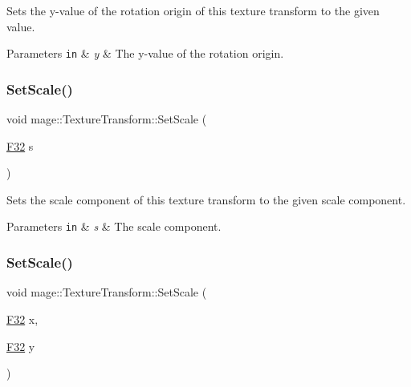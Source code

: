 Sets the y-\/value of the rotation origin of this texture transform to the given value.


\begin{DoxyParams}[1]{Parameters}
\mbox{\tt in}  & {\em y} & The y-\/value of the rotation origin. \\
\hline
\end{DoxyParams}
\hypertarget{classmage_1_1_texture_transform_aee6f84fbb4b7d57931aab72b6cec5b6c}{}\label{classmage_1_1_texture_transform_aee6f84fbb4b7d57931aab72b6cec5b6c} 
\subsubsection{\texorpdfstring{Set\+Scale()}{SetScale()}\hspace{0.1cm}{\footnotesize\ttfamily [1/4]}}
{\footnotesize\ttfamily void mage\+::\+Texture\+Transform\+::\+Set\+Scale (\begin{DoxyParamCaption}\item[{\hyperlink{namespacemage_aa97e833b45f06d60a0a9c4fc22ae02c0}{F32}}]{s }\end{DoxyParamCaption})\hspace{0.3cm}{\ttfamily [noexcept]}}

Sets the scale component of this texture transform to the given scale component.


\begin{DoxyParams}[1]{Parameters}
\mbox{\tt in}  & {\em s} & The scale component. \\
\hline
\end{DoxyParams}
\hypertarget{classmage_1_1_texture_transform_ac3af8885cf4b4c6ad97138bbaf12cda1}{}\label{classmage_1_1_texture_transform_ac3af8885cf4b4c6ad97138bbaf12cda1} 
\subsubsection{\texorpdfstring{Set\+Scale()}{SetScale()}\hspace{0.1cm}{\footnotesize\ttfamily [2/4]}}
{\footnotesize\ttfamily void mage\+::\+Texture\+Transform\+::\+Set\+Scale (\begin{DoxyParamCaption}\item[{\hyperlink{namespacemage_aa97e833b45f06d60a0a9c4fc22ae02c0}{F32}}]{x,  }\item[{\hyperlink{namespacemage_aa97e833b45f06d60a0a9c4fc22ae02c0}{F32}}]{y }\end{DoxyParamCaption})\hspace{0.3cm}{\ttfamily [noexcept]}}

